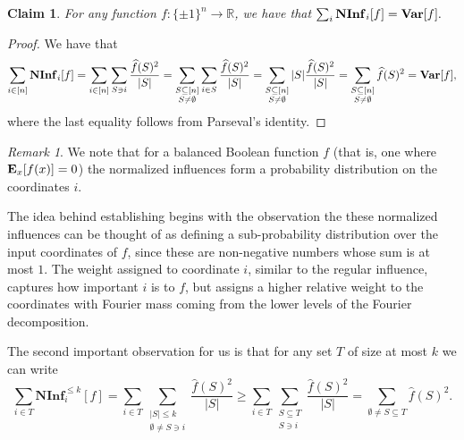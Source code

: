 \documentclass[10pt,a4paper]{article}
\theoremstyle{plain}
\newtheorem{claim}[theorem]{Claim}
\theoremstyle{remark}
\newtheorem{remark}[theorem]{Remark}
\theoremstyle{plain}
\providecommand{\R}{}
\renewcommand{\R}{\mathbb{R}}
\providecommand{\E}{}
\renewcommand{\E}{\mathop{\bf E\/}}
\newcommand{\Var}{\mathop{\bf Var\/}}
\newcommand\NormInf{{\mathbf{NInf}}}
\renewcommand{\hat}{\widehat}
\newcommand{\pmone}{\{\pm 1\}}
\begin{document}
\begin{claim}
For any function $f:\pmone^n\to\R$, we have that $\sum_i\NormInf_i[f] = \Var[f].$
\end{claim}
\begin{proof}
We have that
\[
\sum_{i\in [n]}\NormInf_i[f] = \sum_{i \in [n]}\sum_{ S \ni i}\frac{\hat{f}(S)^2}{|S|} = \sum_{\substack{ S \subseteq[n] \\ S \neq \emptyset}}\sum_{i \in S}\frac{\hat{f}(S)^2}{|S|} = \sum_{\substack{ S \subseteq[n] \\ S \neq \emptyset}}|S|\frac{\hat{f}(S)^2}{|S|} = \sum_{\substack{ S \subseteq[n] \\ S \neq \emptyset}}\hat{f}(S)^2 = \Var[f],
\]
where the last equality follows from Parseval's identity.
\end{proof}
\begin{remark}
We note that for a balanced Boolean function $f$ (that is, one where $\E_x[f(x)] = 0$) the normalized influences form a probability distribution on the coordinates $i$.
\end{remark}
The idea behind establishing   begins with the observation the these normalized influences can be thought of as defining a sub-probability distribution over the input coordinates of $f$, since these are non-negative numbers whose  sum is at most $1$. The weight assigned to coordinate $i$, similar to the regular influence, captures how important $i$ is to $f$, but assigns a higher relative weight to the coordinates with Fourier mass coming from the lower levels of the Fourier decomposition. 

The second important observation for us is that for any set $T$ of size at most $k$ we can write 
\begin{equation}
\label{eq:normed-infs}
    \sum_{i\in T} \NormInf_i^{\leq k}[f] = \sum_{i\in T} \sum_{\substack{|S| \leq k\\\emptyset \neq S \ni i}} \frac{\hat{f}(S)^2}{|S|} \geq \sum_{i\in T} \sum_{\substack{ S \subseteq T \\ S \ni i}}  \frac{\hat{f}(S)^2}{|S|} = \sum_{\emptyset \neq S \subseteq T}\hat{f}(S)^2.
\end{equation}
\end{document}
